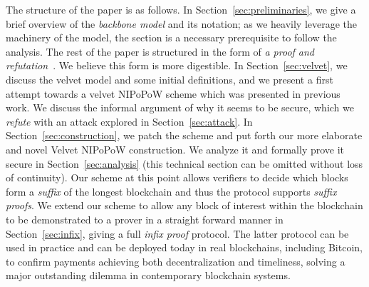 The structure of the paper is as follows. In Section~\ref{sec:preliminaries}, we
give a brief overview of the \emph{backbone model} and its notation; as we
heavily leverage the machinery of the model, the section is a necessary
prerequisite to follow the analysis. The rest of the paper is structured in the
form of \emph{a proof and refutation}~\cite{lakatos}. We believe this form is
more digestible. In Section~\ref{sec:velvet}, we discuss the velvet model and
some initial definitions, and we present a first attempt towards a velvet
NIPoPoW scheme which was presented in previous work. We discuss the informal
argument of why it seems to be secure, which we \emph{refute} with an attack explored
in Section~\ref{sec:attack}. In Section~\ref{sec:construction}, we patch the
scheme and put forth our more elaborate and novel Velvet NIPoPoW construction.
We analyze it and formally prove it secure in Section~\ref{sec:analysis} (this
technical section can be omitted without loss of continuity). Our scheme at this
point allows verifiers to decide which blocks form a \emph{suffix} of the
longest blockchain and thus the protocol supports \emph{suffix proofs}. We
extend our scheme to allow any block of interest within the blockchain to be
demonstrated to a prover in a straight forward manner in
Section~\ref{sec:infix}, giving a full \emph{infix proof} protocol. The latter
protocol can be used in practice and can be deployed today in real blockchains,
including Bitcoin, to confirm payments achieving both decentralization and
timeliness, solving a major outstanding dilemma in contemporary blockchain
systems.

\cite{backbone}\cite{selfish}

